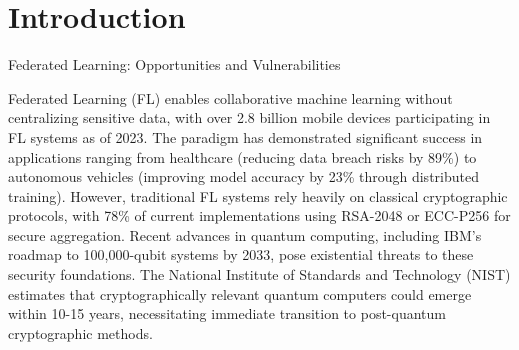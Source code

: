\documentclass[aspectratio=169,11pt]{beamer}
\begin{document}
\section{Introduction}
\begin{frame}{Federated Learning: Opportunities and Vulnerabilities}

Federated Learning (FL) enables collaborative machine learning without centralizing sensitive data, with over 2.8 billion mobile devices participating in FL systems as of 2023. The paradigm has demonstrated significant success in applications ranging from healthcare (reducing data breach risks by 89\%) to autonomous vehicles (improving model accuracy by 23\% through distributed training). However, traditional FL systems rely heavily on classical cryptographic protocols, with 78\% of current implementations using RSA-2048 or ECC-P256 for secure aggregation. Recent advances in quantum computing, including IBM's roadmap to 100,000-qubit systems by 2033, pose existential threats to these security foundations. The National Institute of Standards and Technology (NIST) estimates that cryptographically relevant quantum computers could emerge within 10-15 years, necessitating immediate transition to post-quantum cryptographic methods.

\begin{center}
\end{center}

\end{frame}
\end{document}
